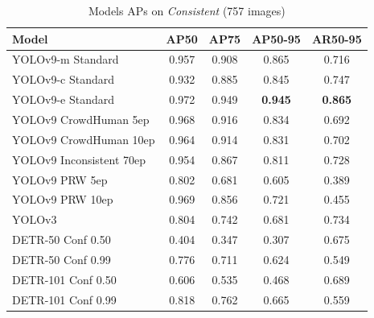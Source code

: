 \begin{table}[H]
    \centering
    \renewcommand{\arraystretch}{1.5}
    \setlength{\tabcolsep}{1em}
    \begin{tabular}{|l|c|c|c|c|}
        \hline
        \rowcolor{gray!25}
        \textbf{Model} & \textbf{AP50} & \textbf{AP75} & \textbf{AP50-95} & \textbf{AR50-95} \\ \hline
        YOLOv9-m Standard         & 0.957 & 0.908 & 0.865 & 0.716 \\ \hline
        YOLOv9-c Standard         & 0.932 & 0.885 & 0.845 & 0.747 \\ \hline
        YOLOv9-e Standard         & 0.972 & 0.949 & \textbf{0.945} & \textbf{0.865} \\ \hline
        YOLOv9 CrowdHuman 5ep     & 0.968 & 0.916 & 0.834 & 0.692 \\ \hline
        YOLOv9 CrowdHuman 10ep    & 0.964 & 0.914 & 0.831 & 0.702 \\ \hline
        YOLOv9 Inconsistent 70ep  & 0.954 & 0.867 & 0.811 & 0.728 \\ \hline
        YOLOv9 PRW 5ep            & 0.802 & 0.681 & 0.605 & 0.389 \\ \hline
        YOLOv9 PRW 10ep           & 0.969 & 0.856 & 0.721 & 0.455 \\ \hline
        YOLOv3                    & 0.804 & 0.742 & 0.681 & 0.734 \\ \hline
        DETR-50 Conf 0.50         & 0.404 & 0.347 & 0.307 & 0.675 \\ \hline
        DETR-50 Conf 0.99         & 0.776 & 0.711 & 0.624 & 0.549 \\ \hline
        DETR-101 Conf 0.50        & 0.606 & 0.535 & 0.468 & 0.689 \\ \hline
        DETR-101 Conf 0.99        & 0.818 & 0.762 & 0.665 & 0.559 \\ \hline
    \end{tabular}
    \caption{Models APs on \textit{Consistent} (757 images)}
    \label{tab:APs_models_COCO}
\end{table}


